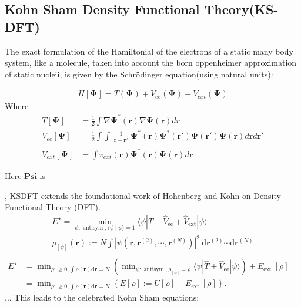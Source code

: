 \subsection{Kohn Sham Density Functional Theory(KS-DFT)}
The exact formulation of the Hamiltonial of the electrons of a static many body system, like a molecule, taken into account the born oppenheimer approximation of static nucleii, is given by the Schrödinger equation(using natural units):


\begin{align}
H[\mathbf{\Psi}] = T(\mathbf{\Psi}) + V_{ee}(\mathbf{\Psi}) + V_{ext}(\mathbf{\Psi})
\end{align}
Where
\begin{align}
    T[\mathbf{\Psi}] &= \frac{1}{2}\int\nabla\mathbf{\Psi}^*(\mathbf{r})\nabla\mathbf{\Psi}(\mathbf{r}) dr \\
    V_{ee}[\mathbf{\Psi}] &= \frac{1}{2}\int\int\frac{1}{|\mathbf{r}-\mathbf{r'}|}\mathbf{\Psi}^*(\mathbf{r})\mathbf{\Psi}^*(\mathbf{r}')\mathbf{\Psi}(\mathbf{r}')\mathbf{\Psi}(\mathbf{r})d\mathbf{r}d\mathbf{r'}\\
    V_{ext}[\mathbf{\Psi}] &= \int v_{ext}(\mathbf{r})\mathbf{\Psi}^*(\mathbf{r})\mathbf{\Psi}(\mathbf{r})d\mathbf{r}
\end{align}

Here $\mathbf{Psi}$ is


 \cite{KohnSham1965}, KSDFT extends the foundational work of Hohenberg and Kohn \cite{HohenbergKohn1964} on Density Functional Theory (DFT).
\begin{align}
    E^{\star}=\min _{\psi: \text { antisym },\langle\psi \mid \psi\rangle=1}\langle\psi| \hat{T}+\hat{V}_{\mathrm{ee}}+\hat{V}_{\mathrm{ext}}|\psi\rangle\\
    \rho_{[\psi]}(\mathbf{r}):=N \int\left|\psi\left(\mathbf{r}, \mathbf{r}^{(2)}, \cdots, \mathbf{r}^{(N)}\right)\right|^2 \mathrm{~d} \mathbf{r}^{(2)} \cdots \mathrm{d} \mathbf{r}^{(N)}\\
\end{align}
$\begin{aligned} E^{\star} & =\min _{\rho: \geqslant 0, \int \rho(\mathbf{r}) \mathrm{d} \mathbf{r}=N}\left(\min _{\psi: \text { antisym }, \rho_{[\psi]}=\rho}\langle\psi| \hat{T}+\hat{V}_{\mathrm{ee}}|\psi\rangle\right)+E_{\text {ext }}[\rho] \\ & =\min _{\rho: \geqslant 0, \int \rho(\mathbf{r}) \mathrm{d} \mathbf{r}=N}\left\{E[\rho]:=U[\rho]+E_{\text {ext }}[\rho]\right\} .\end{aligned}$
...
This leads to the celebrated Kohn Sham equations:

